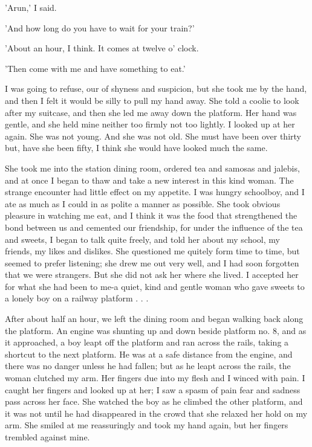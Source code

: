 'Arun,' I said.
\par
'And how long do you have to wait for your train?'
\par
'About an hour, I think. It comes at twelve o' clock.
\par
'Then come with me and have something to eat.'
\par
I was going to refuse, our of shyness and suspicion, but she took me by the hand, and then I felt it would be silly to pull my hand away. She told a coolie to look after my suitcase, and then she led me away down the platform. Her hand was gentle, and she held mine neither too firmly not too lightly. I looked up at her again. She was not young. And she was not old. She must have been over thirty but, have she been fifty, I think she would have looked much the same.
\par
She took me into the station dining room, ordered tea and samosas and jalebis, and at once I began to thaw and take a new interest in this kind woman. The strange encounter had little effect on my appetite. I was hungry schoolboy, and I ate as much as I could in as polite a manner as possible. She took obvious pleasure in watching me eat, and I think it was the food that strengthened the bond between us and cemented our friendship, for under the influence of the tea and sweets, I began to talk quite freely, and told her about my school, my friends, my likes and dislikes. She questioned me quitely form time to time, but seemed to prefer listening; she drew me out very well, and I had soon forgotten that we were strangers. But she did not ask her where she lived. I accepted her for what she had been to me-a quiet, kind and gentle woman who gave sweets to a lonely boy on a railway platform . . .
\par
After about half an hour, we left the dining room and began walking back along the platform. An engine was shunting up and down beside platform no. 8, and as it approached, a boy leapt off the platform and ran across the rails, taking a shortcut to the next platform. He was at a safe distance from the engine, and there was no danger unless he had fallen; but as he leapt across the rails, the woman clutched my arm. Her fingers due into my flesh and I winced with pain. I caught her fingers and looked up at her; I saw a spasm of pain fear and sadness pass across her face. She watched the boy as he climbed the other platform, and it was not until he had disappeared in the crowd that she relaxed her hold on my arm. She smiled at me reassuringly and took my hand again, but her fingers trembled against mine.
